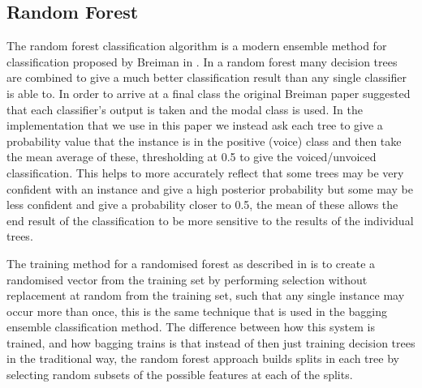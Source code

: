 \documentclass[ %
                    author={Sam Phippen},
                supervisor={Dr. Rafal Bogacz},
                     title={Real time voice activity detectors in noisy personal computing environments},
                  subtitle={},
                    degree={MEng},
                      year={2012} ]{thesis}
\begin{document}

\subsection{Random Forest}
\label{section:random-forest}

The random forest classification algorithm is a modern ensemble method for
classification proposed by Breiman in \cite{breiman}. In a random forest many
decision trees are combined to give a much better classification result than
any single classifier is able to. In order to arrive at a final class the
original Breiman paper suggested that each classifier's output is taken and the
modal class is used. In the implementation that we use in this paper we instead
ask each tree to give a probability value that the instance is in the positive
(voice) class and then take the mean average of these, thresholding at 0.5 to
give the voiced/unvoiced classification. This helps to more accurately reflect
that some trees may be very confident with an instance and give a high
posterior probability but some may be less confident and give a probability
closer to 0.5, the mean of these allows the end result of the classification to
be more sensitive to the results of the individual trees.

The training method for a randomised forest as described in \cite{breiman} is
to create a randomised vector from the training set by performing selection
without replacement at random from the training set, such that any single
instance may occur more than once, this is the same technique that is used in
the bagging ensemble classification method. The difference between how this
system is trained, and how bagging trains is that instead of then just training
decision trees in the traditional way, the random forest approach builds splits
in each tree by selecting random subsets of the possible features at each of
the splits.
\end{document}
